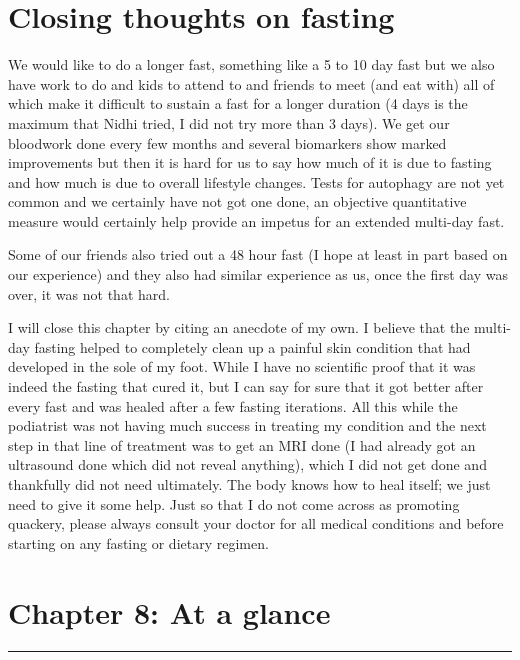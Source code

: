 \documentclass[
  oneside]{book}
\begin{document}
\hypertarget{closing-thoughts-on-fasting}{%
\section{Closing thoughts on fasting}\label{closing-thoughts-on-fasting}}

We would like to do a longer fast, something like a 5 to 10 day fast but we also have work to do and kids to attend to and friends to meet (and eat with) all of which make it difficult to sustain a fast for a longer duration (4 days is the maximum that Nidhi tried, I did not try more than 3 days). We get our bloodwork done every few months and several biomarkers show marked improvements but then it is hard for us to say how much of it is due to fasting and how much is due to overall lifestyle changes. Tests for autophagy are not yet common and we certainly have not got one done, an objective quantitative measure would certainly help provide an impetus for an extended multi-day fast.

Some of our friends also tried out a 48 hour fast (I hope at least in part based on our experience) and they also had similar experience as us, once the first day was over, it was not that hard.

I will close this chapter by citing an anecdote of my own. I believe that the multi-day fasting helped to completely clean up a painful skin condition that had developed in the sole of my foot. While I have no scientific proof that it was indeed the fasting that cured it, but I can say for sure that it got better after every fast and was healed after a few fasting iterations. All this while the podiatrist was not having much success in treating my condition and the next step in that line of treatment was to get an MRI done (I had already got an ultrasound done which did not reveal anything), which I did not get done and thankfully did not need ultimately. The body knows how to heal itself; we just need to give it some help. Just so that I do not come across as promoting quackery, please always consult your doctor for all medical conditions and before starting on any fasting or dietary regimen.

\hypertarget{chapter-8-at-a-glance}{%
\section{Chapter 8: At a glance}\label{chapter-8-at-a-glance}}

\begin{center}\rule{0.5\linewidth}{0.5pt}\end{center}
\end{document}
